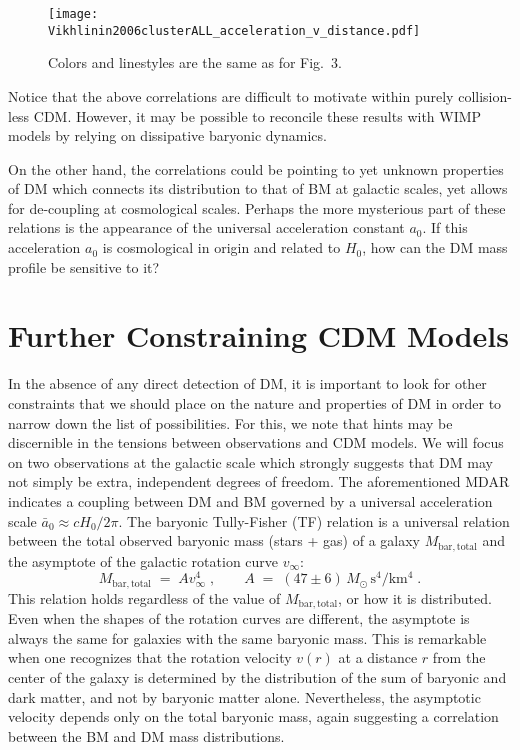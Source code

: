 \documentclass{bjp}
\newcommand{\ac}{\bar{a}_0}
\begin{document}
\begin{figure*}
  \texttt{[image: Vikhlinin2006clusterALL\_acceleration\_v\_distance.pdf]}
  \caption{Colors and linestyles are the same as for Fig.~3.}
  \label{fig_acceleration_v_distance}
\end{figure*}



Notice that the above correlations are difficult to motivate within purely collision-less CDM. However, it may be possible to reconcile these results with WIMP models\cite{Ludlow:2016qzh,Navarro:2016bfs} by relying on dissipative baryonic dynamics.


On the other hand, the correlations could be pointing to yet unknown properties of DM which
connects its distribution to that of BM at galactic scales, yet allows for de-coupling at cosmological scales. Perhaps the more mysterious part of these relations is the appearance of the universal acceleration constant $a_0$. If this acceleration $a_0$  is cosmological in origin and related to $H_0$, how can the DM mass profile be sensitive to it?


\section{Further Constraining CDM Models}

In the absence of any direct detection of DM, it is important to look for other constraints that we should place on the nature and properties of DM in order to narrow down the list of possibilities. For this, we note that hints may be discernible in the tensions between observations and CDM models. We will focus on two observations at the galactic scale which strongly suggests that DM may not simply be extra, independent degrees of freedom. The aforementioned MDAR indicates a coupling between DM and BM governed by a universal acceleration scale $\ac \approx cH_0/2\pi$. The baryonic Tully-Fisher (TF) relation\cite{Tully:1977fu} is a universal relation between the total observed baryonic mass (stars + gas) of a galaxy $M_\mathrm{bar,total}$ and the asymptote of the galactic rotation curve $v_\infty$:
%
\begin{equation}
M_\mathrm{bar,total} \;=\; Av_\infty^4\;,\qquad
A \;=\; (47\pm 6) \,M_\odot\,\mathrm{s^4/km^4}\;.
\label{TullyFisher}
\end{equation}
%
This relation holds regardless of the value of $M_\mathrm{bar,total}$, or how it is distributed.
Even when the shapes of the rotation curves are different, the asymptote is always the same for galaxies with the
same baryonic mass.
This is remarkable when one recognizes that the rotation velocity $v(r)$ 
at a distance $r$ from the center of the galaxy is determined by the distribution of the
sum of baryonic and dark matter, and not by baryonic matter alone.
Nevertheless, the asymptotic velocity depends only on the total baryonic mass,
again suggesting a correlation between the BM and DM mass distributions. 
\end{document}
